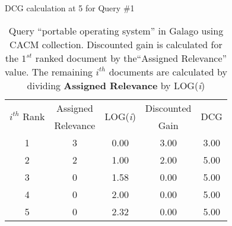 \begin{table}[!htbp]
	\caption{DCG calculation at 5 for Query \#1} \label{tab:dcg-at5-cal}
	\begin{center}
	\vspace{-5mm}
		\begin{tabular}{ c | c | c | c | c}
			\toprule
			\multirow{2}{*}{\textit{$i^{th}$} Rank} & Assigned & \multirow{2}{*}{LOG(\textit{i})} & Discounted & \multirow{2}{*}{DCG}\\
			& Relevance & & Gain & \\
			\midrule
			1 & 3 & 0.00 & 3.00 & 3.00 \\
			2 & 2 & 1.00 & 2.00 & 5.00 \\
			3 & 0 & 1.58 & 0.00 & 5.00 \\
			4 & 0 & 2.00 & 0.00 & 5.00 \\
			5 & 0 & 2.32 & 0.00 & 5.00 \\
			\bottomrule
		\end{tabular}
	\caption*{\scriptsize Query ``portable operating system'' in Galago using CACM collection. Discounted gain is calculated for the $1^{st}$ ranked document by the``Assigned Relevance'' value. The remaining $i^{th}$ documents are calculated by dividing \textbf{Assigned Relevance} by LOG(\textit{i}) }
	 \end{center}
\end{table}
